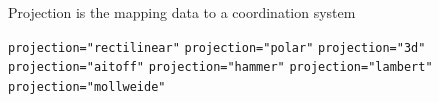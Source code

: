 Projection is the mapping data to a coordination system

\texttt{projection="rectilinear"}
\texttt{projection="polar"}
\texttt{projection="3d"}
\texttt{projection="aitoff"}
\texttt{projection="hammer"}
\texttt{projection="lambert"}
\texttt{projection="mollweide"}